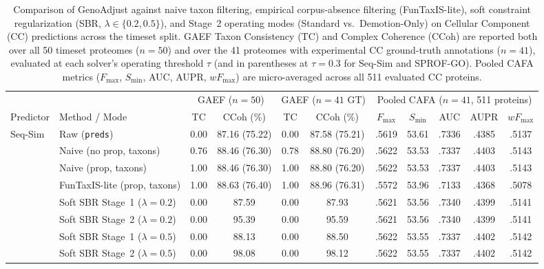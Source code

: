 \begin{table}[!h]
\centering
\caption{Comparison of GenoAdjust against naive taxon filtering, empirical corpus-absence filtering (FunTaxIS-lite), soft constraint regularization (SBR, $\lambda \in \{0.2, 0.5\}$), and Stage~2 operating modes (Standard vs.\ Demotion-Only) on Cellular Component (CC) predictions across the timeset split. GAEF Taxon Consistency (TC) and Complex Coherence (CCoh) are reported both over all 50 timeset proteomes ($n=50$) and over the 41 proteomes with experimental CC ground-truth annotations ($n=41$), evaluated at each solver's operating threshold $\tau$ (and in parentheses at $\tau=0.3$ for Seq-Sim and SPROF-GO). Pooled CAFA metrics ($F_{\max}$, $S_{\min}$, AUC, AUPR, $wF_{\max}$) are micro-averaged across all 511 evaluated CC proteins.}
\label{tab:supp-baselines}
\scriptsize
\setlength{\tabcolsep}{2.0pt}
\renewcommand{\arraystretch}{0.92}
\begin{tabular}{ll cc cc ccccc}
\toprule
 & & \multicolumn{2}{c}{GAEF ($n=50$)} & \multicolumn{2}{c}{GAEF ($n=41$ GT)} & \multicolumn{5}{c}{Pooled CAFA ($n=41$, 511 proteins)} \\
\cmidrule(lr){3-4}\cmidrule(lr){5-6}\cmidrule(lr){7-11}
Predictor & Method / Mode & TC & CCoh (\%) & TC & CCoh (\%) & $F_{\max}$ & $S_{\min}$ & AUC & AUPR & $wF_{\max}$ \\
\midrule
\multirow{12}{*}{Seq-Sim}
 & Raw (\texttt{preds})             & 0.00 & 87.16 (75.22) & 0.00 & 87.58 (75.21) & .5619 & 53.61 & .7336 & .4385 & .5137 \\
 & Naive (no prop, taxons)          & 0.76 & 88.46 (76.30) & 0.78 & 88.80 (76.20) & .5622 & 53.53 & .7337 & .4403 & .5143 \\
 & Naive (prop, taxons)             & 1.00 & 88.46 (76.30) & 1.00 & 88.80 (76.20) & .5622 & 53.53 & .7337 & .4403 & .5143 \\
 & FunTaxIS-lite (prop, taxons)     & 1.00 & 88.63 (76.40) & 1.00 & 88.96 (76.31) & .5572 & 53.96 & .7133 & .4368 & .5078 \\
 & Soft SBR Stage~1 ($\lambda=0.2$) & 0.00 & 87.59 & 0.00 & 87.93 & .5621 & 53.56 & .7340 & .4399 & .5141 \\
 & Soft SBR Stage~2 ($\lambda=0.2$) & 0.00 & 95.39 & 0.00 & 95.59 & .5621 & 53.56 & .7340 & .4399 & .5141 \\
 & Soft SBR Stage~1 ($\lambda=0.5$) & 0.00 & 88.13 & 0.00 & 88.50 & .5622 & 53.55 & .7337 & .4402 & .5142 \\
 & Soft SBR Stage~2 ($\lambda=0.5$) & 0.00 & 98.08 & 0.00 & 98.12 & .5622 & 53.55 & .7337 & .4402 & .5142 \\

\end{tabular}
\end{table}
